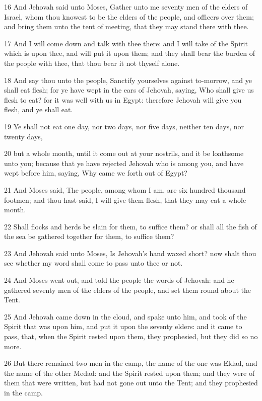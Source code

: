 \par 16 And Jehovah said unto Moses, Gather unto me seventy men of the elders of Israel, whom thou knowest to be the elders of the people, and officers over them; and bring them unto the tent of meeting, that they may stand there with thee.
\par 17 And I will come down and talk with thee there: and I will take of the Spirit which is upon thee, and will put it upon them; and they shall bear the burden of the people with thee, that thou bear it not thyself alone.
\par 18 And say thou unto the people, Sanctify yourselves against to-morrow, and ye shall eat flesh; for ye have wept in the ears of Jehovah, saying, Who shall give us flesh to eat? for it was well with us in Egypt: therefore Jehovah will give you flesh, and ye shall eat.
\par 19 Ye shall not eat one day, nor two days, nor five days, neither ten days, nor twenty days,
\par 20 but a whole month, until it come out at your nostrils, and it be loathsome unto you; because that ye have rejected Jehovah who is among you, and have wept before him, saying, Why came we forth out of Egypt?
\par 21 And Moses said, The people, among whom I am, are six hundred thousand footmen; and thou hast said, I will give them flesh, that they may eat a whole month.
\par 22 Shall flocks and herds be slain for them, to suffice them? or shall all the fish of the sea be gathered together for them, to suffice them?
\par 23 And Jehovah said unto Moses, Is Jehovah's hand waxed short? now shalt thou see whether my word shall come to pass unto thee or not.
\par 24 And Moses went out, and told the people the words of Jehovah: and he gathered seventy men of the elders of the people, and set them round about the Tent.
\par 25 And Jehovah came down in the cloud, and spake unto him, and took of the Spirit that was upon him, and put it upon the seventy elders: and it came to pass, that, when the Spirit rested upon them, they prophesied, but they did so no more.
\par 26 But there remained two men in the camp, the name of the one was Eldad, and the name of the other Medad: and the Spirit rested upon them; and they were of them that were written, but had not gone out unto the Tent; and they prophesied in the camp.

